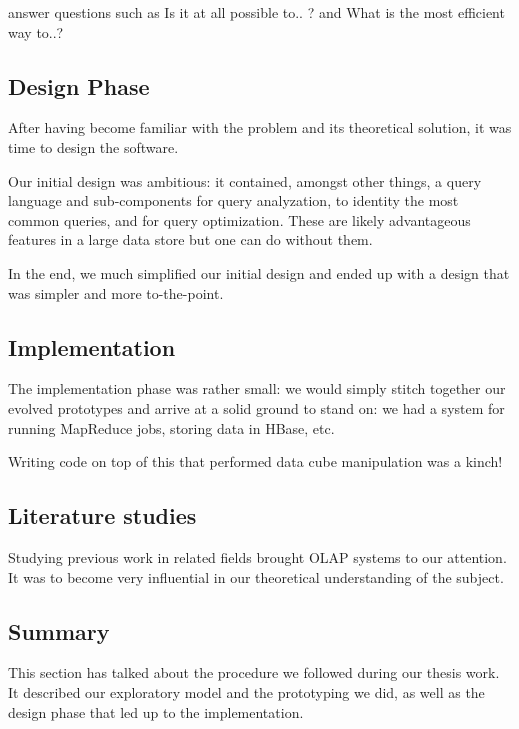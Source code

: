 answer questions such as Is it at all possible to.. ? and What is the most
efficient way to..?

\subsection*{Design Phase}

After having become familiar with the problem and its theoretical solution, it
was time to design the software.

Our initial design was ambitious: it contained, amongst other things, a query
language and sub-components for query analyzation, to identity the most common
queries, and for query optimization. These are likely advantageous features in a
large data store but one can do without them.

In the end, we much simplified our initial design and ended up with a design
that was simpler and more to-the-point.

\subsection*{Implementation}

The implementation phase was rather small: we would simply stitch together our evolved prototypes and arrive at a solid ground to stand on: we had a system for running MapReduce jobs, storing data in HBase, etc.

Writing code on top of this that performed data cube manipulation was a kinch!

\subsection*{Literature studies}

Studying previous work in related fields brought OLAP systems to our attention.
It was to become very influential in our theoretical understanding of the
subject.

\subsection*{Summary}

This section has talked about the procedure we followed during our thesis work. It described our exploratory model and the prototyping we did, as well as the design phase that led up to the implementation.



